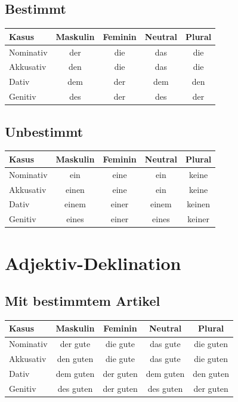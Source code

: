 \subsection{Bestimmt}
\begin{center}
\begin{tabular}{|l|c|c|c|c|}
\hline
\textbf{Kasus} & \textbf{Maskulin} & \textbf{Feminin} & \textbf{Neutral} & \textbf{Plural} \\ \hline
Nominativ & der & die & das & die \\ \hline
Akkusativ & den & die & das & die \\ \hline
Dativ & dem & der & dem & den \\ \hline
Genitiv & des & der & des & der \\ \hline
\end{tabular}
\end{center}

\subsection{Unbestimmt}
\begin{center}
\begin{tabular}{|l|c|c|c|c|}
\hline
\textbf{Kasus} & \textbf{Maskulin} & \textbf{Feminin} & \textbf{Neutral} & \textbf{Plural} \\ \hline
Nominativ & ein & eine & ein & keine \\ \hline
Akkusativ & einen & eine & ein & keine \\ \hline
Dativ & einem & einer & einem & keinen \\ \hline
Genitiv & eines & einer & eines & keiner \\ \hline
\end{tabular}
\end{center}

\section{Adjektiv-Deklination}
\label{sec:AdjektivDeklination}

\subsection{Mit bestimmtem Artikel}
\begin{center}
\begin{tabular}{|l|c|c|c|c|}
\hline
\textbf{Kasus} & \textbf{Maskulin} & \textbf{Feminin} & \textbf{Neutral} & \textbf{Plural} \\ \hline
Nominativ & der gute & die gute & das gute & die guten \\ \hline
Akkusativ & den guten & die gute & das gute & die guten \\ \hline
Dativ & dem guten & der guten & dem guten & den guten \\ \hline
Genitiv & des guten & der guten & des guten & der guten \\ \hline
\end{tabular}
\end{center}

